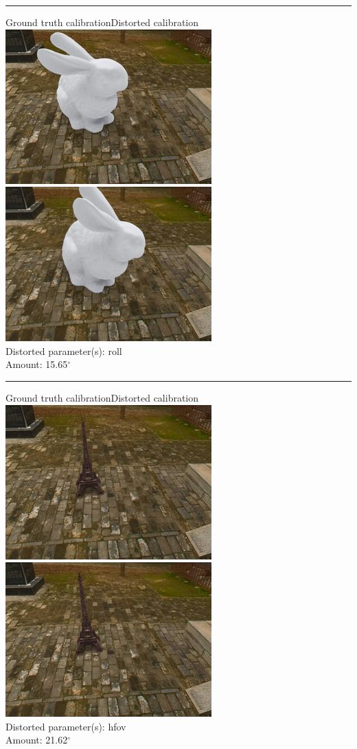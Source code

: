 \begin{minipage}{\linewidth}
\centering
\hrule\vspace{1em}
Ground truth calibration\hspace{0.2\linewidth}Distorted calibration\
\includegraphics[width=0.45\linewidth]{study/thumb/pano_ahxnzyleoiflya-0_5_gt.jpg}
\includegraphics[width=0.45\linewidth]{study/thumb/pano_ahxnzyleoiflya-0_5_dc.jpg}\\
Distorted parameter(s): roll\\
Amount: 15.65$^\circ$
\end{minipage}

\begin{minipage}{\linewidth}
\centering
\hrule\vspace{1em}
Ground truth calibration\hspace{0.2\linewidth}Distorted calibration\
\includegraphics[width=0.45\linewidth]{study/thumb/pano_ahxnzyleoiflya-0_6_gt.jpg}
\includegraphics[width=0.45\linewidth]{study/thumb/pano_ahxnzyleoiflya-0_6_dc.jpg}\\
Distorted parameter(s): hfov\\
Amount: 21.62$^\circ$
\end{minipage}



